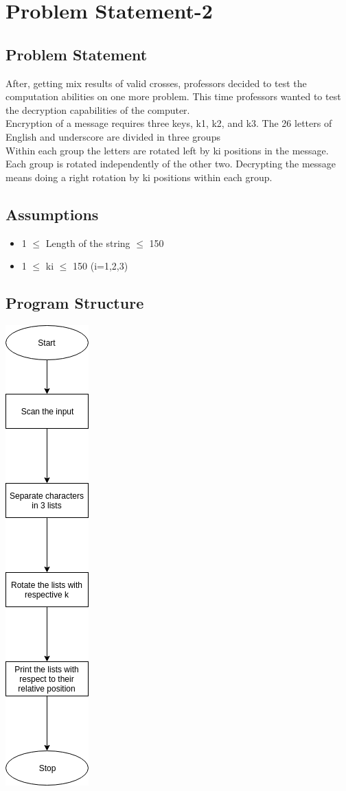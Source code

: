 \documentclass{article}
\begin{document}
\section{Problem Statement-2}
\subsection{Problem Statement}
After, getting mix results of valid crosses, professors decided to test the computation abilities on one more problem. This time professors wanted to test the decryption capabilities of the computer. \\
Encryption of  a message requires three keys, k1, k2, and k3. The 26 letters of English and underscore are divided in three groups \\
Within each group the letters are rotated left by ki positions in the message. Each group is rotated independently of the other two. Decrypting the message means doing a right rotation by ki positions within each group.
\subsection{Assumptions}
\begin{itemize}
\item 1 $\leq$ Length of the string $\leq$ 150
\item 1 $\leq$ ki $\leq$ 150 (i=1,2,3)
\end{itemize}
\subsection{Program Structure}
\includegraphics[scale = 0.5]{ps2c}
\end{document}
